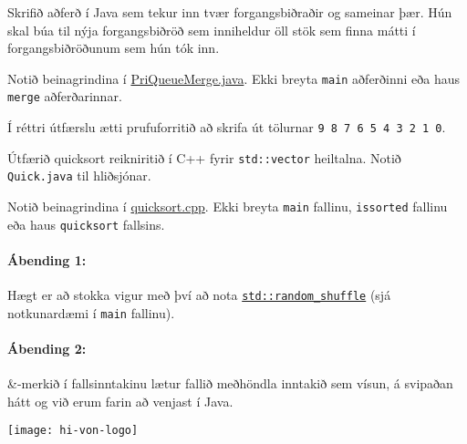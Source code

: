 \documentclass{article}
\begin{document}
\newpage

\question

Skrifið aðferð í Java sem tekur inn tvær forgangsbiðraðir og sameinar þær. 
Hún skal búa til nýja forgangsbiðröð sem inniheldur öll stök sem finna mátti í forgangsbiðröðunum sem hún tók inn. 

Notið beinagrindina í \href{https://github.com/Ernir/kennsluefni/tree/master/T2/Code/w7/PriQueueMerge.java}{PriQueueMerge.java}. Ekki breyta \texttt{main} aðferðinni eða haus \texttt{merge} aðferðarinnar.

Í réttri útfærslu ætti prufuforritið að skrifa út tölurnar \texttt{9 8 7 6 5 4 3 2 1 0}.

\question

Útfærið quicksort reikniritið í C++ fyrir \texttt{std::vector} heiltalna. Notið \texttt{Quick.java} til hliðsjónar.

Notið beinagrindina í \href{https://github.com/Ernir/kennsluefni/tree/master/T2/Code/w7/quicksort.cpp}{quicksort.cpp}. Ekki breyta \texttt{main} fallinu, \texttt{issorted} fallinu eða haus \texttt{quicksort} fallsins.

\paragraph{Ábending 1:} Hægt er að stokka vigur með því að nota \href{http://www.cplusplus.com/reference/algorithm/random_shuffle/}{\texttt{std::random\_shuffle}} (sjá notkunardæmi í \texttt{main} fallinu).
\paragraph{Ábending 2:} \&-merkið í fallsinntakinu lætur fallið meðhöndla inntakið sem vísun, á svipaðan hátt og við erum farin að venjast í Java. 

\vfill
\texttt{[image: hi-von-logo]}
\end{document}
